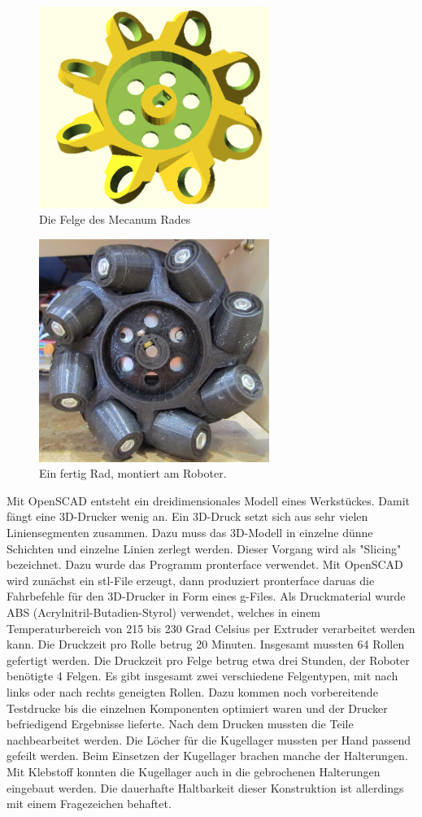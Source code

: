 \documentclass[a4paper,bibtotoc,oneside]{scrbook}
\begin{document}
\begin{figure}[htbp]
\centering
\includegraphics[width=75mm]{img/wheel.png}
\caption{Die Felge des Mecanum Rades}\label{rad}
\end{figure}

\begin{figure}[htbp]
\centering
\includegraphics[width=75mm]{img/rad.jpg}
\caption{Ein fertig Rad, montiert am Roboter.}\label{rad2}
\end{figure}


Mit OpenSCAD entsteht ein dreidimensionales Modell eines Werkstückes. Damit fängt eine 3D-Drucker wenig an. Ein 3D-Druck setzt sich aus sehr vielen Liniensegmenten zusammen. Dazu muss das 3D-Modell in einzelne dünne Schichten und einzelne Linien zerlegt werden. Dieser Vorgang wird als "Slicing" bezeichnet. Dazu wurde das Programm pronterface verwendet. Mit OpenSCAD wird zunächst ein stl-File erzeugt, dann produziert pronterface daruas die Fahrbefehle für den 3D-Drucker in Form eines g-Files. Als Druckmaterial wurde ABS (Acrylnitril-Butadien-Styrol) verwendet, welches in einem Temperaturbereich von 215 bis 230 Grad Celsius per Extruder verarbeitet werden kann.    
Die Druckzeit pro Rolle betrug 20 Minuten. Insgesamt mussten 64 Rollen gefertigt werden. Die Druckzeit pro Felge betrug etwa drei Stunden, der Roboter benötigte 4 Felgen. Es gibt insgesamt zwei verschiedene Felgentypen, mit nach links oder nach rechts geneigten Rollen. 
Dazu kommen noch vorbereitende Testdrucke bis die einzelnen Komponenten optimiert waren und der Drucker befriedigend Ergebnisse lieferte. 
Nach dem Drucken mussten die Teile nachbearbeitet werden.  Die Löcher für die Kugellager mussten per Hand passend gefeilt werden. Beim  Einsetzen der Kugellager brachen manche der Halterungen. Mit Klebstoff konnten die Kugellager auch in die gebrochenen Halterungen eingebaut werden. Die dauerhafte Haltbarkeit dieser Konstruktion ist allerdings mit einem Fragezeichen behaftet.
\end{document}
